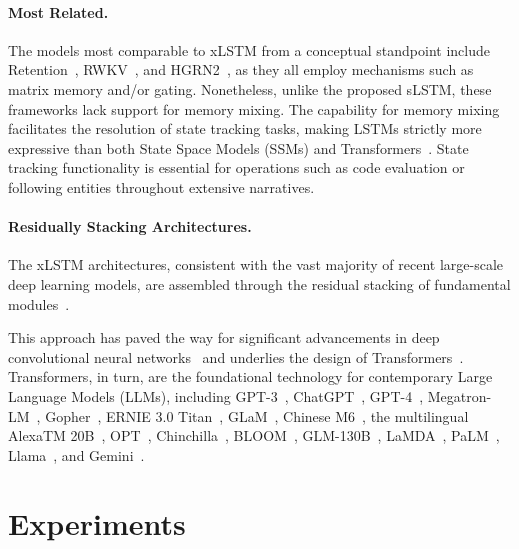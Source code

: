 \paragraph{Most Related.} The models most comparable to xLSTM from a conceptual standpoint include Retention~\citep{Sun:23arxiv}, RWKV~\citep{Peng:23arxivshort,Peng:24arxivshort}, and HGRN2~\citep{Qin:24arxiv}, as they all employ mechanisms such as matrix memory and/or gating. Nonetheless, unlike the proposed sLSTM, these frameworks lack support for memory mixing. The capability for memory mixing facilitates the resolution of state tracking tasks, making LSTMs strictly more expressive than both State Space Models (SSMs) and Transformers~\citep{Merrill:24,Deletang:23}. State tracking functionality is essential for operations such as code evaluation or following entities throughout extensive narratives.

\paragraph{Residually Stacking Architectures.} The xLSTM architectures, consistent with the vast majority of recent large-scale deep learning models, are assembled through the residual stacking of fundamental modules~\citep{Srivastava:15,He:16}.

This approach has paved the way for significant advancements in deep convolutional neural networks~\citep{He:16} and underlies the design of Transformers~\citep{Vaswani:17}. Transformers, in turn, are the foundational technology for contemporary Large Language Models (LLMs), including GPT-3~\citep{Brown:20short}, ChatGPT~\citep{Schulman:22short}, GPT-4~\citep{Achiam:23gpt4short}, Megatron-LM~\citep{Shoeybi:19}, Gopher~\citep{Rae:21short}, ERNIE 3.0 Titan~\citep{Wang:21arxivshort}, GLaM~\citep{Du:21glamshort}, Chinese M6~\citep{Lin:21}, the multilingual AlexaTM 20B~\citep{Soltan:22}, OPT~\citep{Zhang:22opt}, Chinchilla~\citep{Hoffmann:22short}, BLOOM~\citep{Scao:22arxivshort}, GLM-130B~\citep{Zeng:22arxivshort}, LaMDA~\citep{Thoppilan:22short}, PaLM~\citep{Chowdhery:22short}, Llama~\citep{Touvron:23arxiv}, and Gemini~\citep{GeminiTeam:23arxiv,Reid:24arxiv}.

\section{Experiments}
\label{sec:Exp}

